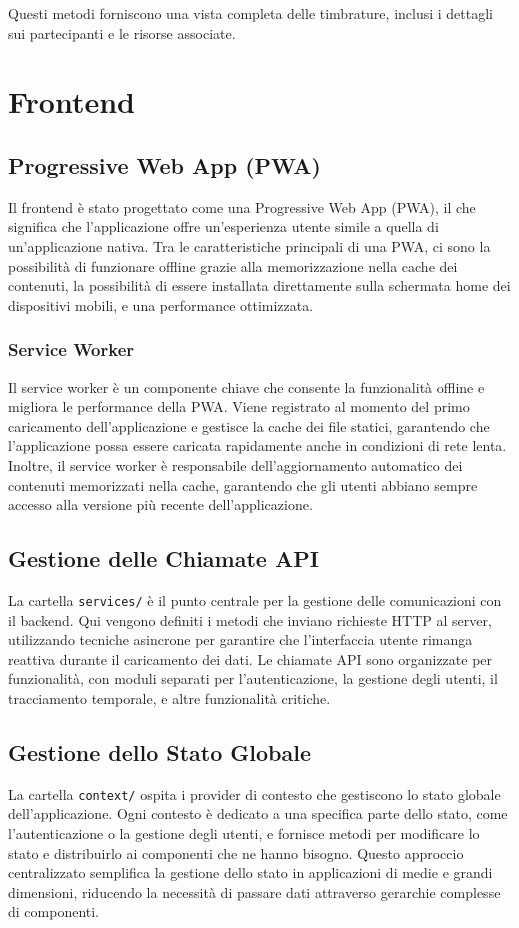 \documentclass[twoside]{supsistudent}
\begin{document}
Questi metodi forniscono una vista completa delle timbrature, inclusi i dettagli sui partecipanti e le risorse associate.

\section{Frontend}

\subsection{Progressive Web App (PWA)}
Il frontend è stato progettato come una Progressive Web App (PWA), il che significa che l'applicazione offre un'esperienza utente simile a quella di un'applicazione nativa. Tra le caratteristiche principali di una PWA, ci sono la possibilità di funzionare offline grazie alla memorizzazione nella cache dei contenuti, la possibilità di essere installata direttamente sulla schermata home dei dispositivi mobili, e una performance ottimizzata.

\subsubsection{Service Worker}
Il service worker è un componente chiave che consente la funzionalità offline e migliora le performance della PWA. Viene registrato al momento del primo caricamento dell'applicazione e gestisce la cache dei file statici, garantendo che l'applicazione possa essere caricata rapidamente anche in condizioni di rete lenta. Inoltre, il service worker è responsabile dell'aggiornamento automatico dei contenuti memorizzati nella cache, garantendo che gli utenti abbiano sempre accesso alla versione più recente dell'applicazione.


\subsection{Gestione delle Chiamate API}
La cartella \texttt{services/} è il punto centrale per la gestione delle comunicazioni con il backend. Qui vengono definiti i metodi che inviano richieste HTTP al server, utilizzando tecniche asincrone per garantire che l'interfaccia utente rimanga reattiva durante il caricamento dei dati. Le chiamate API sono organizzate per funzionalità, con moduli separati per l'autenticazione, la gestione degli utenti, il tracciamento temporale, e altre funzionalità critiche.

\subsection{Gestione dello Stato Globale}
La cartella \texttt{context/} ospita i provider di contesto che gestiscono lo stato globale dell'applicazione. Ogni contesto è dedicato a una specifica parte dello stato, come l'autenticazione o la gestione degli utenti, e fornisce metodi per modificare lo stato e distribuirlo ai componenti che ne hanno bisogno. Questo approccio centralizzato semplifica la gestione dello stato in applicazioni di medie e grandi dimensioni, riducendo la necessità di passare dati attraverso gerarchie complesse di componenti.
\end{document}
